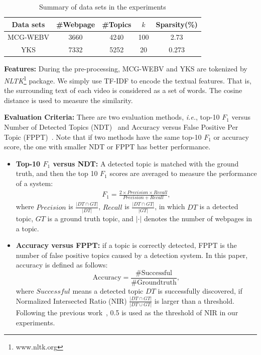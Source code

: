 \documentclass[runningheads]{llncs}
\begin{document}
\begin{table}[t!]
\begin{center}
\caption{Summary of data sets in the experiments} \label{tab:dataset}
\begin{tabular}{|c|c|c|c|c|}
  \hline
  Data sets & \#Webpage & \#Topics & $k$ & Sparsity(\%)\\
  \hline\hline
  MCG-WEBV & 3660 & 4240 & 100 & 2.73\\
  \hline
  YKS & 7332 & 5252 & 20 & 0.273\\
  \hline
\end{tabular}
\end{center}
\end{table}

\textbf{Features:} During the pre-processing, MCG-WEBV and YKS are tokenized by \emph{NLTK}\footnote{www.nltk.org} package.
We simply use TF-IDF to encode the textual features. That is, the surrounding text of each video is considered as a set of words. The cosine distance is used to measure the similarity.

\textbf{Evaluation Criteria:}  There are two evaluation methods, \emph{i.e.}, top-10 $F_1$ versus Number of Detected Topics (NDT)~\cite{cao-2011-tracking} and Accuracy versus False Positive Per Topic (FPPT)~\cite{pang-2013-unsupervised}. Note that if two methods have the same top-10 $F_1$ or accuracy score, the one with smaller NDT or FPPT has better performance.

\begin{itemize}
\item \textbf{Top-10 $F_1$ versus NDT:} A detected topic is matched with the ground truth, and then the top 10 $F_1$ scores are averaged to measure the performance of a system:
\begin{eqnarray}
F_1=\frac{2\times Precision \times Recall}{Precision+Recall},
\end{eqnarray}
where $Precision$ is $\frac{|DT \cap GT|}{|DT|}$, $Recall$ is $\frac{|DT \cap GT|}{|GT|}$,
in which $DT$ is a detected topic, $GT$ is a ground truth topic, and $|\cdot |$ denotes the number of webpages in a topic.
\item \textbf{Accuracy versus FPPT:} if a topic is correctly detected, FPPT is the number of false positive topics caused by a detection system. In this paper, accuracy is defined as follows:
\begin{equation}\label{equa:accuracy}
\text{Accuracy}=\frac{\# \text{Successful} }{\# \text{Groundtruth}},
\end{equation}
where $Successful$ means a detected topic $DT$ is successfully discovered, if Normalized Intersected Ratio (NIR) $\frac{|DT \cap GT|}{|DT \cup GT|}$ is larger than a threshold. Following the previous work~\cite{pang-2013-unsupervised}, 0.5 is used as the threshold of NIR in our experiments.
\end{itemize}
\end{document}
